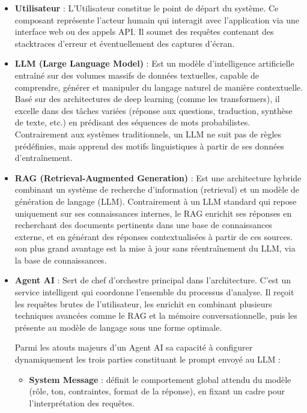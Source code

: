 \documentclass[12pt,a4paper]{report}
\begin{document}
	\begin{itemize}
		
		\item \textbf{Utilisateur} : L'Utilisateur constitue le point de départ du système. Ce composant représente l'acteur humain qui interagit avec l'application via une interface web ou des appels API. Il soumet des requêtes contenant des stacktraces d'erreur et éventuellement des captures d'écran.
		
		\item \textbf{LLM (Large Language Model)} : Est un modèle d'intelligence artificielle entraîné sur des volumes massifs de données textuelles, capable de comprendre, générer et manipuler du langage naturel de manière contextuelle. Basé sur des architectures de deep learning (comme les transformers), il excelle dans des tâches variées (réponse aux questions, traduction, synthèse de texte, etc.) en prédisant des séquences de mots probabilistes. Contrairement aux systèmes traditionnels, un LLM ne suit pas de règles prédéfinies, mais apprend des motifs linguistiques à partir de ses données d'entraînement.
		
		\item \textbf{RAG (Retrieval-Augmented Generation)} : Est une architecture hybride combinant un système de recherche d'information (retrieval) et un modèle de génération de langage (LLM). Contrairement à un LLM standard qui repose uniquement sur ses connaissances internes, le RAG enrichit ses réponses en recherchant des documents pertinents dans une base de connaissances externe, et en générant des réponses contextualisées à partir de ces sources. son plus grand avantage est la mise à jour sans réentraînement du LLM, via la base de connaissances. \cite{rag}
		
		\item \textbf{Agent AI} : Sert de chef d'orchestre principal dans l'architecture. C'est un service intelligent qui coordonne l'ensemble du processus d'analyse. Il reçoit les requêtes brutes de l'utilisateur, les enrichit en combinant plusieurs techniques avancées comme le RAG et la mémoire conversationnelle, puis les présente au modèle de langage sous une forme optimale.
		
		Parmi les atouts majeurs d'un Agent AI sa capacité à configurer dynamiquement les trois parties constituant le prompt envoyé au LLM :
		
		\begin{itemize}
			
			\item \textbf{System Message} : définit le comportement global attendu du modèle (rôle, ton, contraintes, format de la réponse), en fixant un cadre pour l’interprétation des requêtes.
			

\end{itemize}
\end{itemize}
\end{document}
